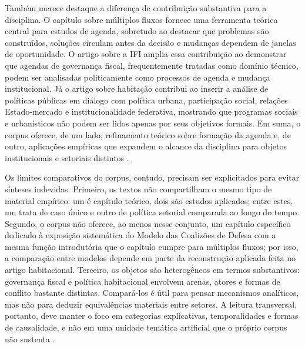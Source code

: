 \documentclass[12pt,a4paper]{article}
\begin{document}
Também merece destaque a diferença de contribuição substantiva para a disciplina. O capítulo sobre múltiplos fluxos fornece uma ferramenta teórica central para estudos de agenda, sobretudo ao destacar que problemas são construídos, soluções circulam antes da decisão e mudanças dependem de janelas de oportunidade. O artigo sobre a IFI amplia essa contribuição ao demonstrar que agendas de governança fiscal, frequentemente tratadas como domínio técnico, podem ser analisadas politicamente como processos de agenda e mudança institucional. Já o artigo sobre habitação contribui ao inserir a análise de políticas públicas em diálogo com política urbana, participação social, relações Estado-mercado e institucionalidade federativa, mostrando que programas sociais e urbanísticos não podem ser lidos apenas por seus objetivos formais. Em suma, o corpus oferece, de um lado, refinamento teórico sobre formação da agenda e, de outro, aplicações empíricas que expandem o alcance da disciplina para objetos institucionais e setoriais distintos \parencite{brasil2022_abordagens_contemporaneas,anonsd_sem_titulo,ferreira2019_politica_habitacional}.

Os limites comparativos do corpus, contudo, precisam ser explicitados para evitar sínteses indevidas. Primeiro, os textos não compartilham o mesmo tipo de material empírico: um é capítulo teórico, dois são estudos aplicados; entre estes, um trata de caso único e outro de política setorial comparada ao longo do tempo. Segundo, o corpus não oferece, ao menos nesse conjunto, um capítulo específico dedicado à exposição sistemática do Modelo das Coalizões de Defesa com a mesma função introdutória que o capítulo cumpre para múltiplos fluxos; por isso, a comparação entre modelos depende em parte da reconstrução aplicada feita no artigo habitacional. Terceiro, os objetos são heterogêneos em termos substantivos: governança fiscal e política habitacional envolvem arenas, atores e formas de conflito bastante distintas. Compará-los é útil para pensar mecanismos analíticos, mas não para deduzir equivalências materiais entre setores. A leitura transversal, portanto, deve manter o foco em categorias explicativas, temporalidades e formas de causalidade, e não em uma unidade temática artificial que o próprio corpus não sustenta \parencite{brasil2022_abordagens_contemporaneas,anonsd_sem_titulo,ferreira2019_politica_habitacional}.
\end{document}
